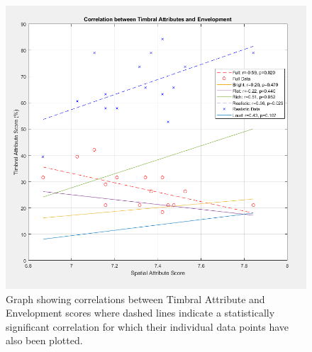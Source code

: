 	\begin{figure}
		\includegraphics[width=\linewidth]{images/plots/sa_ta_corr_env.PNG}
		\caption{Graph showing correlations between Timbral Attribute and Envelopment scores where dashed lines indicate a statistically significant correlation for which their individual data points have also been plotted.}
		\label{image:corr_env} 
	\end{figure}		
